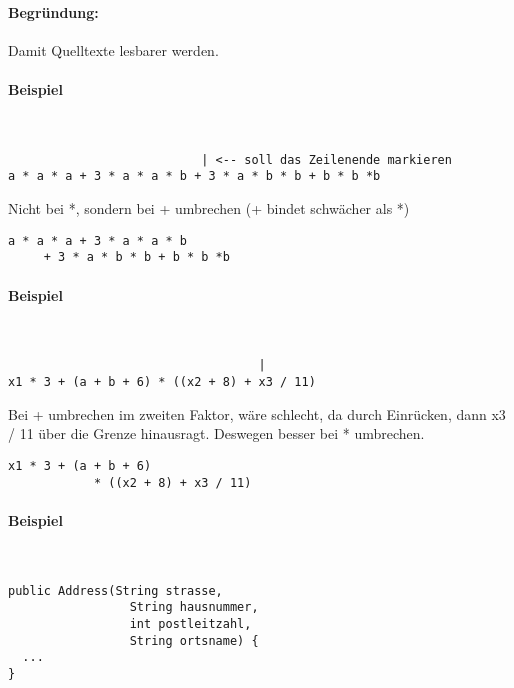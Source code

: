 \paragraph{Begründung:} Damit Quelltexte lesbarer werden.


\paragraph{Beispiel} \hspace{0pt}\\
\begin{lstlisting}
                           | <-- soll das Zeilenende markieren
a * a * a + 3 * a * a * b + 3 * a * b * b + b * b *b
\end{lstlisting}

Nicht bei *, sondern bei + umbrechen (+ bindet schwächer als *)

\begin{lstlisting}
a * a * a + 3 * a * a * b
     + 3 * a * b * b + b * b *b
\end{lstlisting}

\paragraph{Beispiel} \hspace{0pt}\\
\begin{lstlisting}
                                   |
x1 * 3 + (a + b + 6) * ((x2 + 8) + x3 / 11)
\end{lstlisting}

Bei + umbrechen im zweiten Faktor, wäre schlecht, da durch Einrücken, dann x3 / 11 über die Grenze hinausragt. Deswegen besser bei * umbrechen.

\begin{lstlisting}
x1 * 3 + (a + b + 6)
            * ((x2 + 8) + x3 / 11)
\end{lstlisting}


\paragraph{Beispiel} \hspace{0pt}\\
\begin{lstlisting}
public Address(String strasse,
                 String hausnummer,
                 int postleitzahl,
                 String ortsname) {
  ...
}
\end{lstlisting}


